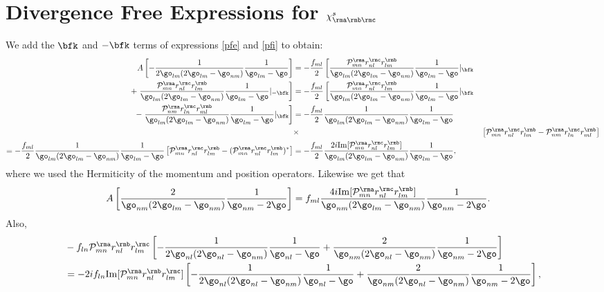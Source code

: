 \chapter{Divergence Free Expressions for $\chi^s_{\rma\rmb\rmc}$}
We add the $\bfk$ and $-\bfk$ terms of expressions \eqref{pfe} and
\eqref{pfi} to obtain:
\begin{align}\label{chi1}
A
\left[
-\frac{1}{2\go_{lm}(2\go_{lm}-\go_{nm})}\frac{1}{\go_{lm}-\go}
\right]&=-\frac{f_{ml}}{2}
\left[
\frac{{\cal P}^{\rma}_{mn}r^{\rmc}_{nl}r^{\rmb}_{lm}}{\go_{lm}(2\go_{lm}-\go_{nm})}\frac{1}{\go_{lm}-\go}|_{\bfk}
\right.
\nonumber\\
+
\left.
\frac{{\cal P}^{\rma}_{mn}r^{\rmc}_{nl}r^{\rmb}_{lm}}{\go_{lm}(2\go_{lm}-\go_{nm})}\frac{1}{\go_{lm}-\go}|_{-\bfk}
\right]
&=-\frac{f_{ml}}{2}
\left[
\frac{{\cal P}^{\rma}_{mn}r^{\rmc}_{nl}r^{\rmb}_{lm}}{\go_{lm}(2\go_{lm}-\go_{nm})}\frac{1}{\go_{lm}-\go}|_{\bfk}
\right.
\nonumber\\
-
\left.
\frac{{\cal P}^{\rma}_{nm}r^{\rmc}_{ln}r^{\rmb}_{ml}}{\go_{lm}(2\go_{lm}-\go_{nm})}\frac{1}{\go_{lm}-\go}|_{\bfk}
\right]
&=-\frac{f_{ml}}{2}
\frac{1}{\go_{lm}(2\go_{lm}-\go_{nm})}\frac{1}{\go_{lm}-\go}
\nonumber\\
&\times&
\left[
{\cal P}^{\rma}_{mn}r^{\rmc}_{nl}r^{\rmb}_{lm}
-
{\cal P}^{\rma}_{nm}r^{\rmc}_{ln}r^{\rmb}_{ml}
\right]
\\
=-\frac{f_{ml}}{2}
\frac{1}{\go_{lm}(2\go_{lm}-\go_{nm})}\frac{1}{\go_{lm}-\go}
\left[
{\cal P}^{\rma}_{mn}r^{\rmc}_{nl}r^{\rmb}_{lm}
-
({\cal P}^{\rma}_{mn}r^{\rmc}_{nl}r^{\rmb}_{lm})^*
\right]
&=-\frac{f_{ml}}{2}
\frac{2i\mathrm{Im}[{\cal P}^{\rma}_{mn}r^{\rmc}_{nl}r^{\rmb}_{lm}]}{\go_{lm}(2\go_{lm}-\go_{nm})}\frac{1}{\go_{lm}-\go}
\nonumber
,
\end{align}
where we used the Hermiticity of the momentum and position operators.
Likewise we get that
\begin{align}\label{si}
A
\left[
\frac{2}{\go_{nm}(2\go_{lm}-\go_{nm})}\frac{1}{\go_{nm}-2\go}
\right]&=
f_{ml}
\frac{4i\mathrm{Im}[{\cal P}^{\rma}_{mn}r^{\rmc}_{nl}r^{\rmb}_{lm}]}{\go_{nm}(2\go_{lm}-\go_{nm})}\frac{1}{\go_{nm}-2\go}
.
\end{align}
Also,
\begin{align}\label{is}
&-
f_{ln}{\cal P}^{\rma}_{mn}r^{\rmb}_{nl}r^{\rmc}_{lm}
\left[
-\frac{1}{2\go_{nl}(2\go_{nl}-\go_{nm})}\frac{1}{\go_{nl}-\go}
+\frac{2}{\go_{nm}(2\go_{nl}-\go_{nm})}\frac{1}{\go_{nm}-2\go}
\right]
\nonumber\\
&=
-
2if_{ln}\mathrm{Im}[{\cal P}^{\rma}_{mn}r^{\rmb}_{nl}r^{\rmc}_{lm}]
\left[
-\frac{1}{2\go_{nl}(2\go_{nl}-\go_{nm})}\frac{1}{\go_{nl}-\go}
+\frac{2}{\go_{nm}(2\go_{nl}-\go_{nm})}\frac{1}{\go_{nm}-2\go}
\right]
,
\end{align}
